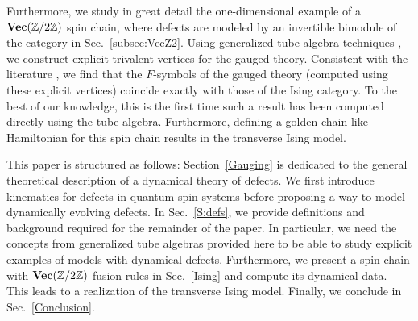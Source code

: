 Furthermore, we study in great detail the one-dimensional example of a $\textbf{Vec}(\mathbb{Z}/2\mathbb{Z})$ spin chain, where defects are modeled by an invertible bimodule of the category in Sec.~\ref{subsec:VecZ2}.
Using generalized tube algebra techniques \cite{ocneanu}, we construct explicit trivalent vertices for the gauged theory. Consistent with the literature \cite{TY,ENO10,Bombin2010,BBCW14,WBV17}, we find that the $F$-symbols of the gauged theory (computed using these explicit vertices) coincide exactly with those of the Ising category. To the best of our knowledge, this is the first time such a result has been computed directly using the tube algebra. Furthermore, defining a golden-chain-like Hamiltonian \cite{Feiguin2007} for this spin chain results in the transverse Ising model.

This paper is structured as follows: Section~\ref{Gauging} is dedicated to the general theoretical description of a dynamical theory of defects. We first introduce kinematics for defects in quantum spin systems before proposing a way to model dynamically evolving defects. In Sec.~\ref{S:defs}, we provide definitions and background required for the remainder of the paper. In particular, we need the concepts from generalized tube algebras provided here to be able to study explicit examples of models with dynamical defects. Furthermore, we present a spin chain with $\textbf{Vec}(\mathbb{Z}/2\mathbb{Z})$ fusion rules in Sec.~\ref{Ising} and compute its dynamical data. This leads to a realization of the transverse Ising model. Finally, we conclude in Sec.~\ref{Conclusion}.